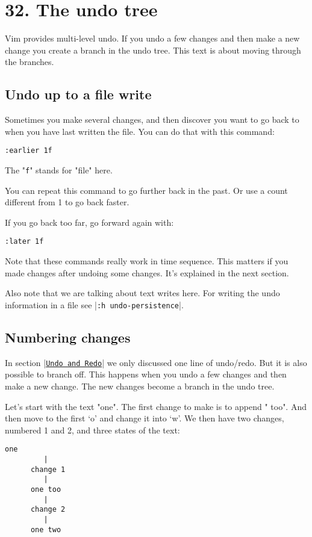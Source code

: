 \section{32. The undo tree}
Vim provides multi-level undo.
If you undo a few changes and then make a new change you create a branch in the undo tree.
This text is about moving through the branches.
\subsection{Undo up to a file write}
Sometimes you make several changes, and then discover you want to go back to when you have last written the file.
You can do that with this command:

\begin{Verbatim}[samepage=true]
 :earlier 1f
\end{Verbatim}

The "\verb!f!" stands for "file" here.

You can repeat this command to go further back in the past.
Or use a count different from 1 to go back faster.

If you go back too far, go forward again with:

\begin{Verbatim}[samepage=true]
 :later 1f
\end{Verbatim}

Note that these commands really work in time sequence.
This matters if you made changes after undoing some changes.
It's explained in the next section.

Also note that we are talking about text writes here.
For writing the undo information in a file see |\verb!:h undo-persistence!|.
\subsection{Numbering changes}
\label{Numbering changes}
In section |\hyperref[Undo and Redo]{\texttt{Undo and Redo}}| we only discussed one line of undo/redo.
But it is also possible to branch off.
This happens when you undo a few changes and then make a new change.
The new changes become a branch in the undo tree.

Let's start with the text "one".
The first change to make is to append " too".
And then move to the first `o' and change it into `w'.
We then have two changes, numbered 1 and 2, and three states of the text:

\begin{Verbatim}[samepage=true]
        one 
         |
      change 1
         |
      one too 
         |
      change 2
         |
      one two 
\end{Verbatim}

